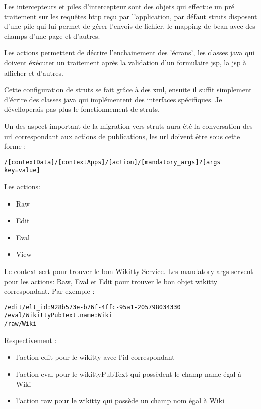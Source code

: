 
Les intercepteurs et piles d'intercepteur sont des objets qui effectue un pré
traitement sur les requêtes http reçu par l'application, par défaut struts
disposent d'une pile qui lui permet de gérer l'envois de fichier, le mapping
de bean avec des champs d'une page et d'autres.

Les actions permettent de décrire l'enchainement des 'écrans', les classes java
qui doivent éxécuter un traitement après la validation d'un formulaire jsp, la
jsp à afficher et d'autres.

Cette configuration de struts se fait grâce à des xml, ensuite il suffit
simplement d'écrire des classes java qui implémentent des interfaces
spécifiques. Je dévelloperais pas plus le fonctionnement de struts.

Un des aspect important de la migration vers struts aura été la conversation des
url correspondant aux actions de publications, les url doivent être sous cette
forme : 
\begin{verbatim}
/[contextData]/[contextApps]/[action]/[mandatory_args]?[args key=value]
\end{verbatim}

Les actions: 
\begin{itemize}
\item Raw
\item Edit
\item Eval
\item View
\end{itemize}

Le context sert pour trouver le bon Wikitty Service. Les mandatory args servent
pour les actions: Raw, Eval et Edit pour trouver le bon objet wikitty
correspondant. Par exemple :

\begin{verbatim}
/edit/elt_id:928b573e-b76f-4ffc-95a1-205798034330 
/eval/WikittyPubText.name:Wiki
/raw/Wiki
\end{verbatim}


Respectivement :
\begin{itemize}
\item l'action edit pour le wikitty avec l'id correspondant
\item l'action eval pour le wikittyPubText qui possèdent le champ name égal à
Wiki
\item l'action raw pour le wikitty qui possède un champ nom égal à Wiki
\end{itemize}

